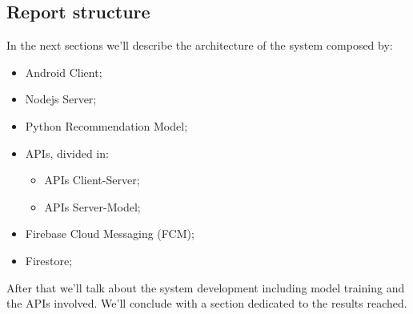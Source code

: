\documentclass[../../main]{subfiles}
\begin{document}
\label{ss:report-structure}
\subsection{Report structure}
In the next sections we'll describe the architecture of the system composed by:
\begin{itemize}
    \item Android Client;
    \item Nodejs Server;
    \item Python Recommendation Model;
    \item APIs, divided in:
    \begin{itemize}
        \item APIs Client-Server;
        \item APIs Server-Model;
    \end{itemize}
    \item Firebase Cloud Messaging (FCM);
    \item Firestore;
\end{itemize} 
After that we'll talk about the system development including model training and the APIs involved.
We'll conclude with a section dedicated to the results reached.
\end{document}
